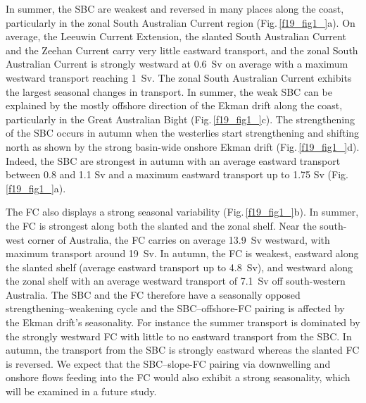 \documentclass[preprint,3p,review,12pt]{elsarticle}
\begin{document}
In summer, the SBC are weakest and reversed in many places along the coast, particularly in the zonal South Australian Current region (Fig.\,\ref{f19_fig1_}a). On average, the Leeuwin Current Extension, the slanted South Australian Current and the Zeehan Current carry very little eastward transport, and the zonal South Australian Current is strongly westward at \SI{0.6}{Sv} on average with a maximum westward transport reaching \SI{1}{Sv}. The zonal South Australian Current exhibits the largest seasonal changes in transport. In summer, the weak SBC can be explained by the mostly offshore direction of the Ekman drift along the coast, particularly in the Great Australian Bight (Fig.\,\ref{f19_fig1_}c). The strengthening of the SBC occurs in autumn when the westerlies start strengthening and shifting north as shown by the strong basin-wide onshore Ekman drift (Fig.\,\ref{f19_fig1_}d). Indeed, the SBC are strongest in autumn with an average eastward transport between 0.8 and 1.1 Sv and a maximum eastward transport up to 1.75 Sv (Fig.\,\ref{f19_fig1_}a).

The FC also displays a strong seasonal variability (Fig.\,\ref{f19_fig1_}b). In summer, the FC is strongest along both the slanted and the zonal shelf. Near the south-west corner of Australia, the FC carries on average \SI{13.9}{Sv} westward, with maximum transport around \SI{19}{Sv}. In autumn, the FC is weakest, eastward along the slanted shelf (average eastward transport up to \SI{4.8}{Sv}), and westward along the zonal shelf with an average westward transport of \SI{7.1}{Sv} off south-western Australia. The SBC and the FC therefore have a seasonally opposed strengthening--weakening cycle and the SBC--offshore-FC pairing is affected by the Ekman drift's seasonality. For instance the summer transport is dominated by the strongly westward FC with little to no eastward transport from the SBC\@. In autumn, the transport from the SBC is strongly eastward whereas the slanted FC is reversed. We expect that the SBC--slope-FC pairing via downwelling and onshore flows feeding into the FC would also exhibit a strong seasonality, which will be examined in a future study.
\end{document}
